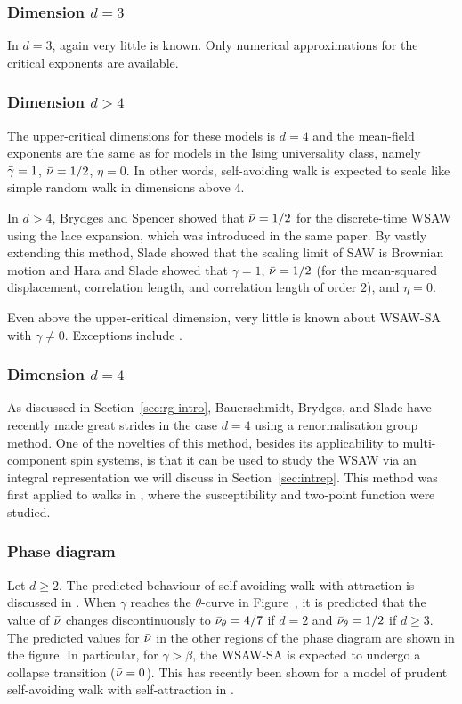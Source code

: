 \subsubsection{Dimension $d = 3$}

In $d = 3$, again very little is known. Only numerical approximations for
the critical exponents are available.

\subsubsection{Dimension $d > 4$}

The upper-critical dimensions for these models is $d = 4$ and the mean-field
exponents are the same as for models in the Ising universality class, namely
$\bar\gamma=1$, $\bar\nu = 1/2$, $\eta = 0$. In other words, self-avoiding walk
is expected to scale like simple random walk in dimensions above $4$.

In $d > 4$, Brydges and Spencer \cite{BS85} showed that $\bar\nu = 1/2$ for the
discrete-time WSAW using the lace expansion, which was introduced in the same paper.
By vastly extending this method, Slade \cite{Slad88} showed that the scaling limit
of SAW is Brownian motion and Hara and Slade \cite{HS92a,HS92b} showed that
$\gamma = 1$, $\bar\nu = 1/2$ (for the mean-squared displacement, correlation length,
and correlation length of order $2$), and $\eta = 0$.

Even above the upper-critical dimension, very little is known about WSAW-SA with
$\gamma \ne 0$. Exceptions include \cite{HH17,Uelt02}.

\subsubsection{Dimension $d = 4$}

As discussed in Section~\ref{sec:rg-intro}, Bauerschmidt, Brydges, and Slade have
recently made great strides in the case $d = 4$ using a renormalisation group method.
One of the novelties of this method, besides its applicability to multi-component
spin systems, is that it can be used to study the WSAW via an integral representation
we will discuss in Section~\ref{sec:intrep}. This method was first applied to walks
in \cite{BBS-saw4-log,BBS-saw4}, where the susceptibility and two-point function were
studied.

\subsubsection{Phase diagram}

Let $d \ge 2$. The predicted behaviour of self-avoiding walk with attraction is discussed
in \cite{Vand98}.
When $\gamma$ reaches the $\theta$-curve in Figure~\REF, it is predicted
that the value of $\bar\nu$ changes discontinuously to $\bar\nu_\theta = 4/7$ if $d = 2$
and $\bar\nu_\theta = 1/2$ if $d \ge 3$. The predicted values for $\bar\nu$
in the other regions of the phase diagram are shown in the figure. In particular, for
$\gamma > \beta$, the WSAW-SA is expected to undergo a collapse transition ($\bar\nu = 0$).
This has recently been shown for a model of prudent self-avoiding walk with self-attraction
in \cite{PT16}.

